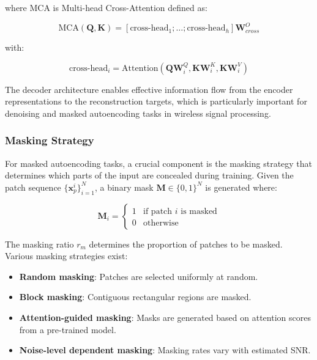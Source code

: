 where MCA is Multi-head Cross-Attention defined as:

\begin{equation}
\text{MCA}(\mathbf{Q}, \mathbf{K}) = [\text{cross-head}_1; \ldots; \text{cross-head}_h]\mathbf{W}^O_{cross}
\end{equation}

with:

\begin{equation}
\text{cross-head}_i = \text{Attention}(\mathbf{Q}\mathbf{W}^Q_i, \mathbf{K}\mathbf{W}^K_i, \mathbf{K}\mathbf{W}^V_i)
\end{equation}

The decoder architecture enables effective information flow from the encoder representations to the reconstruction targets, which is particularly important for denoising and masked autoencoding tasks in wireless signal processing.

\subsubsection{Masking Strategy}

For masked autoencoding tasks, a crucial component is the masking strategy that determines which parts of the input are concealed during training. Given the patch sequence $\{\mathbf{x}_p^i\}_{i=1}^N$, a binary mask $\mathbf{M} \in \{0,1\}^N$ is generated where:

\begin{equation}
\mathbf{M}_i = 
\begin{cases} 
1 & \text{if patch } i \text{ is masked} \\
0 & \text{otherwise}
\end{cases}
\end{equation}

The masking ratio $r_m$ determines the proportion of patches to be masked. Various masking strategies exist:

\begin{itemize}
    \item \textbf{Random masking}: Patches are selected uniformly at random.
    \item \textbf{Block masking}: Contiguous rectangular regions are masked.
    \item \textbf{Attention-guided masking}: Masks are generated based on attention scores from a pre-trained model.
    \item \textbf{Noise-level dependent masking}: Masking rates vary with estimated SNR.
\end{itemize}

